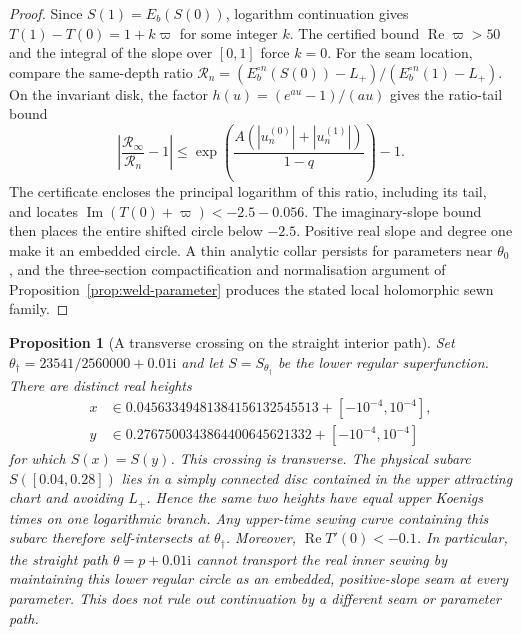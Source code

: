 \documentclass[11pt]{amsart}
\newtheorem{proposition}[theorem]{Proposition}
\theoremstyle{definition}
\newcommand{\ii}{\mathrm{i}}
\begin{document}
\begin{proof}
Since $S(1)=E_b(S(0))$, logarithm continuation gives
$T(1)-T(0)=1+k\varpi$ for some integer $k$.  The certified
bound $\operatorname{Re}\varpi>50$ and the integral of the slope
over $[0,1]$ force $k=0$.  For the seam location, compare the
same-depth ratio
$\mathcal R_n=(E_b^{\circ n}(S(0))-L_+)/
(E_b^{\circ n}(1)-L_+)$.  On the invariant disk, the factor
$h(u)=(e^{au}-1)/(au)$ gives the ratio-tail bound
\[
 \left|\frac{\mathcal R_\infty}{\mathcal R_n}-1\right|
 \le \exp\!\left(
 \frac{A(|u_n^{(0)}|+|u_n^{(1)}|)}{1-q}\right)-1.
\]
The certificate encloses the principal logarithm of this ratio,
including its tail, and locates
$\operatorname{Im}(T(0)+\varpi)<-2.5-0.056$.
The imaginary-slope bound then places the entire shifted circle
below $-2.5$.  Positive real slope and degree one make it an
embedded circle.  A thin analytic collar persists for parameters
near $\theta_0$, and the three-section compactification and
normalisation argument of Proposition~\ref{prop:weld-parameter}
produces the stated local holomorphic sewn family.
\end{proof}

\begin{proposition}[A transverse crossing on the straight interior path]
\label{prop:interior-path-crossing}
Set
$\theta_\dagger=23541/2560000+0.01\ii$ and let
$S=S_{\theta_\dagger}$ be the lower regular superfunction.
There are distinct real heights
\[
\begin{aligned}
x&\in 0.04563349481384156132545513+[-10^{-4},10^{-4}],\\
y&\in 0.2767500343864400645621332+[-10^{-4},10^{-4}]
\end{aligned}
\]
for which $S(x)=S(y)$.  This crossing is transverse.  The physical
subarc $S([0.04,0.28])$ lies in a simply connected disc contained in
the upper attracting chart and avoiding $L_+$.  Hence the same two
heights have equal upper Koenigs times on one logarithmic branch.
Any upper-time sewing curve containing this subarc therefore
self-intersects at $\theta_\dagger$.  Moreover,
$\operatorname{Re}T'(0)<-0.1$.  In particular, the straight path
$\theta=p+0.01\ii$ cannot transport the real inner sewing by
maintaining this lower regular circle as an embedded, positive-slope
seam at every parameter.  This does not rule out continuation by a
different seam or parameter path.
\end{proposition}
\end{document}
